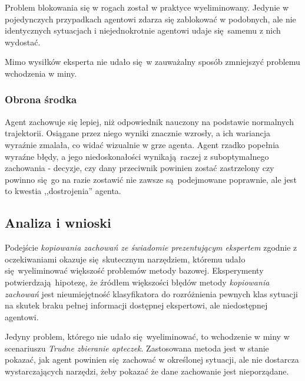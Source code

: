 Problem blokowania się w rogach został w praktyce wyeliminowany. Jedynie w pojedynczych przypadkach agentowi zdarza się zablokować w podobnych, ale nie identycznych sytuacjach i niejednokrotnie agentowi udaje się samemu z nich wydostać.

Mimo wysiłków eksperta nie udało się w zauważalny sposób zmniejszyć problemu wchodzenia w miny.

\subsubsection{Obrona środka}
Agent zachowuje się lepiej, niż odpowiednik nauczony na podstawie normalnych trajektorii.
Osiągane przez niego wyniki znacznie wzrosły, a ich wariancja wyraźnie zmalała, co widać wizualnie w grze agenta. Agent rzadko popełnia wyraźne błędy, a jego niedoskonałości wynikają raczej z suboptymalnego zachowania - decyzje, czy dany przeciwnik powinien zostać zastrzelony czy powinno się go na razie zostawić nie zawsze są podejmowane poprawnie, ale jest to kwestia ,,dostrojenia'' agenta.

\subsection{Analiza i wnioski}

Podejście \textit{kopiowania zachowań ze świadomie prezentującym ekspertem} zgodnie z oczekiwaniami okazuje się skutecznym narzędziem, któremu udało się wyeliminować większość problemów metody bazowej. Eksperymenty potwierdzają hipotezę, że źródłem większości błędów metody \textit{kopiowania zachowań} jest nieumiejętność klasyfikatora do rozróżnienia pewnych klas sytuacji na skutek braku pełnej informacji dostępnej ekspertowi, ale niedostępnej agentowi.

Jedyny problem, którego nie udało się wyeliminować, to wchodzenie w miny w scenariuszu \textit{Trudne zbieranie apteczek}. Zastosowana metoda jest w stanie pokazać, jak agent powinien się zachować w określonej sytuacji, ale nie dostarcza wystarczających narzędzi, żeby pokazać że dane zachowanie jest nieporządane.



